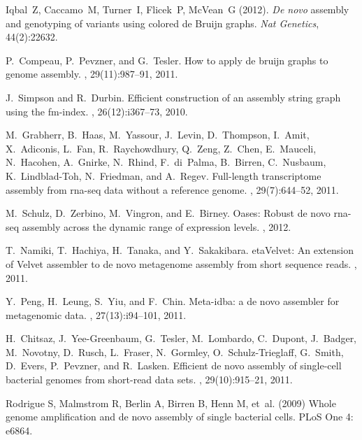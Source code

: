 \documentclass{pnastwo}
\begin{document}
\begin{article}
\begin{thebibliography}{20}
 Iqbal~Z, Caccamo~M, Turner~I, Flicek~P, McVean~G (2012).  {\it De novo} assembly and genotyping of variants using
colored de Bruijn graphs.  {\it Nat Genetics}, 44(2):22632.

P.~Compeau, P.~Pevzner, and G.~Tesler.
\newblock How to apply de bruijn graphs to genome assembly.
, 29(11):987--91, 2011.

J.~Simpson and R.~Durbin.
\newblock Efficient construction of an assembly string graph using the
  fm-index.
, 26(12):i367--73, 2010.

M.~Grabherr, B.~Haas, M.~Yassour, J.~Levin, D.~Thompson, I.~Amit, X.~Adiconis,
  L.~Fan, R.~Raychowdhury, Q.~Zeng, Z.~Chen, E.~Mauceli, N.~Hacohen, A.~Gnirke,
  N.~Rhind, F.~di~Palma, B.~Birren, C.~Nusbaum, K.~Lindblad-Toh, N.~Friedman,
  and A.~Regev.
\newblock Full-length transcriptome assembly from rna-seq data without a
  reference genome.
, 29(7):644--52, 2011.

M.~Schulz, D.~Zerbino, M.~Vingron, and E.~Birney.
\newblock Oases: Robust de novo rna-seq assembly across the dynamic range of
  expression levels.
, 2012.

T.~Namiki, T.~Hachiya, H.~Tanaka, and Y.~Sakakibara.
eta{V}elvet: {A}n extension of {V}elvet assembler to de novo
  metagenome assembly from short sequence reads.
, 2011.

Y.~Peng, H.~Leung, S.~Yiu, and F.~Chin.
\newblock Meta-idba: a de novo assembler for metagenomic data.
, 27(13):i94--101, 2011.

H.~Chitsaz, J.~Yee-Greenbaum, G.~Tesler, M.~Lombardo, C.~Dupont, J.~Badger,
  M.~Novotny, D.~Rusch, L.~Fraser, N.~Gormley, O.~Schulz-Trieglaff, G.~Smith,
  D.~Evers, P.~Pevzner, and R.~Lasken.
\newblock Efficient de novo assembly of single-cell bacterial genomes from
  short-read data sets.
, 29(10):915--21, 2011.

Rodrigue S, Malmstrom R, Berlin A, Birren B, Henn M, et~al. (2009) Whole genome
  amplification and de novo assembly of single bacterial cells.
\newblock PLoS One 4: e6864.


\end{thebibliography}
\end{article}
\end{document}
